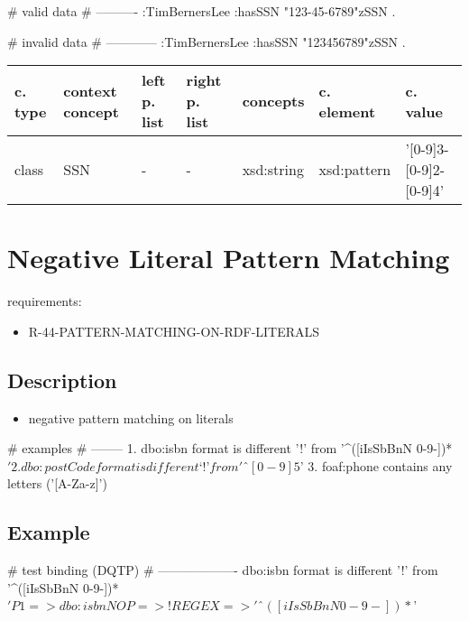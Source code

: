 \documentclass{llncs}
\newenvironment{gcotable}{
  \scriptsize
  \sffamily
  \vspace{0.3cm}
  \begin{tabular}{l|l|l|l|l|l|l}
  \hline
  \textbf{c. type} & \textbf{context concept} & \textbf{left p. list} & \textbf{right p. list} & \textbf{concepts} & \textbf{c. element} & \textbf{c. value} \\
  \hline

}{
  \hline
  \end{tabular}
  \linebreak
}
\begin{document}
\begin{ex}
# valid data
# ----------
:TimBernersLee
    :hasSSN "123-45-6789"^^:SSN .
\end{ex}

\begin{ex}
# invalid data
# ------------
:TimBernersLee
    :hasSSN "123456789"^^:SSN .
\end{ex}

\begin{gcotable}
class & SSN & - & - & xsd:string & xsd:pattern & '[0-9]{3}-[0-9]{2}-[0-9]{4}' \\
\end{gcotable}

\section{Negative Literal Pattern Matching}

requirements:

\begin{itemize}
  \item R-44-PATTERN-MATCHING-ON-RDF-LITERALS
\end{itemize}

\subsection{Description}

\begin{itemize}
	\item negative pattern matching on literals
\end{itemize}

\begin{ex}
# examples
# --------
1. dbo:isbn format is different ’!’ from '^([iIsSbBnN 0-9-])*$'
2. dbo:postCode format is different ‘!’ from 'ˆ[0-9]{5}$'
3. foaf:phone contains any letters ('[A-Za-z]')
\end{ex}

\subsection{Example}

\begin{ex}
# test binding (DQTP)
# -------------------
dbo:isbn format is different ’!’ from '^([iIsSbBnN 0-9-])*$'

P1 => dbo:isbn
NOP => !
REGEX => 'ˆ([iIsSbBnN 0-9-])*$'
\end{ex}
\end{document}
